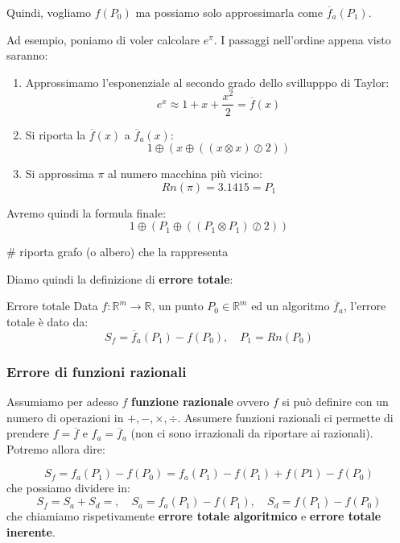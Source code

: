\documentclass[a4paper,11pt]{article}
\begin{document}
Quindi, vogliamo $f(P_0)$ ma possiamo solo approssimarla come $\overline{f}_a(P_1)$.

Ad esempio, poniamo di voler calcolare $e^\pi$.
I passaggi nell'ordine appena visto saranno:
\begin{enumerate}
	\item Approssimamo l'esponenziale al secondo grado dello svillupppo di Taylor:
		$$
			e^x \approx 1 + x + \frac{x^2}{2} = \overline{f}(x)
		$$
	\item Si riporta la $\overline{f}(x)$ a $\overline{f}_a(x)$:
		$$
			1 \oplus \left( x \oplus ( (x \otimes x) \oslash 2) \right)
		$$
	\item Si approssima $\pi$ al numero macchina più vicino:
		$$
			Rn(\pi) = 3.1415 = P_1
		$$
\end{enumerate}

Avremo quindi la formula finale:
$$
1 \oplus \left( P_1 \oplus ( (P_1 \otimes P_1) \oslash 2) \right)
$$

# riporta grafo (o albero) che la rappresenta

\par\medskip

Diamo quindi la definizione di \textbf{errore totale}:
\begin{definition}{Errore totale}
	Data $f : \mathbb{R}^m \rightarrow \mathbb{R}$, un punto $P_0 \in \mathbb{R}^m$ ed un algoritmo $\overline{f}_a$, l'errore totale è dato da:
	$$
		S_f = \overline{f}_a (P_1) - f(P_0), \quad P_1 = Rn(P_0)
	$$
\end{definition}

\subsubsection{Errore di funzioni razionali}
Assumiamo per adesso $f$ \textbf{funzione razionale} ovvero $f$ si può definire con un numero di operazioni in $+, -, \times, \div$.
Assumere funzioni razionali ci permette di prendere $f = \overline{f}$ e $f_a = \overline{f}_a$ (non ci sono irrazionali da riportare ai razionali).
Potremo allora dire:

$$
S_f = f_a(P_1) - f(P_0) = f_a(P_1) - f(P_1) + f(P1) - f(P_0)
$$
che possiamo dividere in:
$$
S_f = S_a + S_d =, \quad S_a = f_a(P_1) - f(P_1), \quad S_d = f(P_1) - f(P_0)
$$
che chiamiamo rispetivamente \textbf{errore totale algoritmico} e \textbf{errore totale inerente}.
\end{document}
